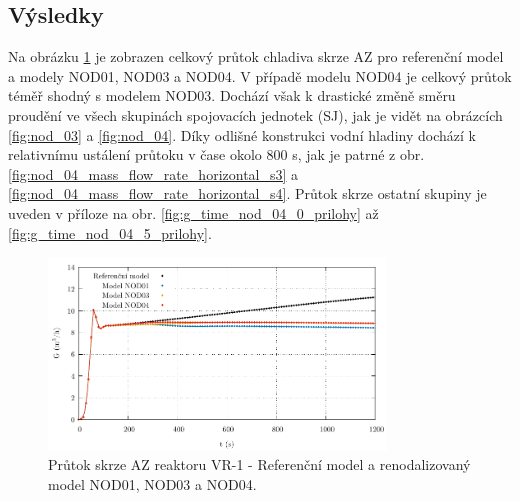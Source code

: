  \subsection{Výsledky}
Na obrázku \ref{fig:nod_04_mass_flow_rate_vertical} je zobrazen celkový průtok chladiva skrze AZ pro referenční model a modely NOD01, NOD03 a NOD04. V případě modelu NOD04 je celkový průtok téměř shodný s modelem NOD03. Dochází však k drastické změně směru proudění ve všech skupinách spojovacích jednotek (SJ), jak je vidět na obrázcích \ref{fig:nod_03} a \ref{fig:nod_04}. Díky odlišné konstrukci vodní hladiny dochází k relativnímu ustálení průtoku v čase okolo 800 s, jak je patrné z obr. \ref{fig:nod_04_mass_flow_rate_horizontal_s3} a \ref{fig:nod_04_mass_flow_rate_horizontal_s4}. Průtok skrze ostatní skupiny je uveden v příloze na obr. \ref{fig:g_time_nod_04_0_prilohy} až \ref{fig:g_time_nod_04_5_prilohy}.
\begin{figure}[H]
	\centering
	\includegraphics[width=0.8\textwidth]{./05_TH_model_VR_1/grafy/nod_04_mass_flow_rate_vertical.pdf}
	\caption{Průtok skrze AZ reaktoru VR-1 - Referenční model a renodalizovaný model NOD01, NOD03 a NOD04.}
	\label{fig:nod_04_mass_flow_rate_vertical}
\end{figure}

